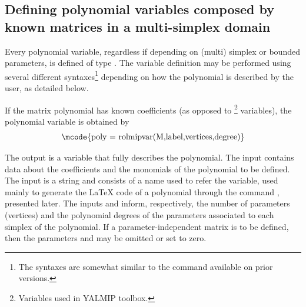 \documentclass[english,11pt]{article}
\theoremstyle{break} \theorembodyfont{\small\rm}
\begin{document}
\subsection{Defining polynomial variables composed by known matrices in a multi-simplex domain}

Every polynomial variable, regardless if depending on (multi) simplex or bounded parameters, is defined of type . 
The variable definition may be performed using
several different syntaxes\footnote{The syntaxes are somewhat similar to the
 command available on prior versions.} depending on how the polynomial is described
by the user, as detailed below.

If the matrix polynomial has known coefficients (as opposed to \footnote{Variables used
in YALMIP toolbox.} variables), the 
polynomial variable is obtained by
\[
\mbox{\mcode{poly = rolmipvar(M,label,vertices,degree)}}
\]

The output  is a  variable that fully describes the polynomial. 
The input  contains data about the coefficients and the monomials of the
polynomial to be defined. 
The input  is a string and consists of a name used to refer the
variable, used mainly to generate the {\LaTeX} code of a polynomial through the command , presented later. 
The inputs  and  inform, respectively, the number
of parameters (vertices) and the polynomial degrees of the parameters associated to each simplex of the polynomial. If a parameter-independent
matrix is to be defined, then the parameters  and  may be omitted
or set to zero.
\end{document}
